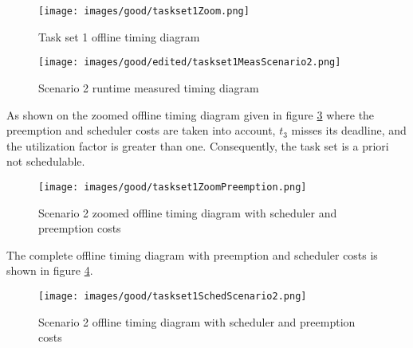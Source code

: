 \documentclass[conference,compsocconf]{IEEEtran}
\begin{document}
\begin{center}
\begin{figure}[h]
\texttt{[image: images/good/taskset1Zoom.png]}
  \caption{ Task set 1 offline timing diagram}
\label{taskSet1SchedZoom}
\end{figure}
\end{center}


\begin{center}
\begin{figure}[h]
\texttt{[image: images/good/edited/taskset1MeasScenario2.png]}
  \caption{ Scenario 2 runtime measured timing diagram}
\label{scenario2Measurements}
\end{figure}
\end{center}


As shown on the zoomed offline timing diagram given in figure \ref{scenario2CostsZoom} where the preemption and scheduler costs are taken into account, $t_3$ misses its deadline, and the utilization factor is greater than one. Consequently, the task set is a priori not schedulable.


\begin{center}
\begin{figure}[h]
\texttt{[image: images/good/taskset1ZoomPreemption.png]}
  \caption{ Scenario 2 zoomed offline timing diagram with scheduler and preemption costs}
\label{scenario2CostsZoom}
\end{figure}
\end{center}

The complete offline timing diagram with preemption and scheduler costs is shown in figure \ref{scenario2costs}.




\begin{center}
\begin{figure}[h]
\texttt{[image: images/good/taskset1SchedScenario2.png]}
  \caption{ Scenario 2 offline timing diagram with scheduler and preemption costs}
\label{scenario2costs}
\end{figure}
\end{center}



\end{document}
